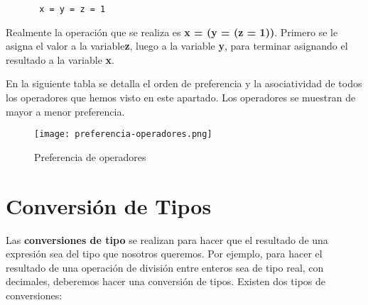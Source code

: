 \begin{figure}[H]
    \begin{tcolorbox}[sharp corners, colback=yellow!30, colframe=white!20]
        \scriptsize
\begin{verbatim}
 x = y = z = 1
\end{verbatim}
    \end{tcolorbox}
\end{figure}

Realmente la operación que se realiza es \textbf{x = (y = (z = 1))}. Primero se le asigna el valor a la variable\textbf{z}, luego a la variable \textbf{y}, para terminar asignando el resultado a la variable \textbf{x}.

En la siguiente tabla se detalla el orden de preferencia y la asociatividad de todos los operadores que hemos visto en este apartado. Los operadores se muestran de mayor a menor preferencia.

\begin{figure}[H]
    \centering
    \texttt{[image: preferencia-operadores.png]}
    \caption{Preferencia de operadores}
\end{figure}

\section{Conversión de Tipos}
Las \textbf{conversiones de tipo} se realizan para hacer que el resultado de una expresión sea del tipo que nosotros queremos. Por ejemplo, para hacer el resultado de una operación de división entre enteros sea de tipo real, con decimales, deberemos hacer una conversión de tipos. Existen dos tipos de conversiones:

